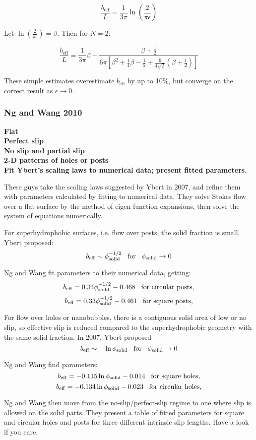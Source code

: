 \documentclass{article}
\newcommand{\beff}{\ensuremath{b_{\mathrm{eff}}}}
\begin{document}
\[ \frac{\beff}{L} = \frac{1}{3 \pi} \ln \left( \frac{2}{\pi \epsilon} \right) \]

Let $\ln \left( \frac{2}{\pi \epsilon} \right) = \beta$.  Then for $N=2$:

\[ \frac{\beff}{L} = \frac{1}{3 \pi}\beta - \frac{\beta + \frac{1}{2}}
{6\pi \left[ \beta^2 + \frac{1}{4}\beta - \frac{1}{2} + \frac{9}{4 \sqrt{2}} 
\left( \beta + \frac{1}{2} \right) 
\right] }\]

These simple estimates overestimate $\beff$ by up to 10\%, but converge on the correct result as $\epsilon \rightarrow 0$.



\subsubsection*{Ng and Wang 2010}
\textbf{Flat\\ Perfect slip\\ No slip and partial slip\\ 2-D patterns of holes or posts\\ Fit Ybert's scaling laws to numerical data; present fitted parameters. }

These guys take the scaling laws suggested by Ybert in 2007, and refine them with parameters calculated by fitting to numerical data.  They solve Stokes flow over a flat surface by the method of eigen function expansions, then solve the system of equations numerically.

For superhydrophobic surfaces, i.e. flow over posts, the solid fraction is small.  Ybert proposed:
\[ \beff \sim \phisol^{-1/2} \;\;\; \text{for} \;\;\; \phisol \rightarrow 0 \]

Ng and Wang fit parameters to their numerical data, getting:
\[ \beff = 0.34 \phisol^{-1/2} - 0.468 \;\;\; \text{for circular posts,} \]
\[ \beff = 0.33 \phisol^{-1/2} - 0.461 \;\;\; \text{for square posts,} \]

For flow over holes or nanobubbles, there is a contiguous solid area of low or no slip, so effective slip is reduced compared to the superhydrophobic geometry with the same solid fraction.  In 2007, Ybert proposed
\[ \beff \sim - \ln \phisol \;\;\; \text{for} \;\;\; \phisol \rightarrow 0 \]

Ng and Wang find parameters:
\[ \beff = -0.115 \ln \phisol - 0.014 \;\;\; \text{for square holes,} \]
\[ \beff = -0.134 \ln \phisol - 0.023 \;\;\; \text{for circular holes,} \]


Ng and Wang then move from the no-slip/perfect-slip regime to one where slip is allowed on the solid parts.  They present a table of fitted parameters for square and circular holes and posts for three different intrinsic slip lengths.  Have a look if you care.
\end{document}
